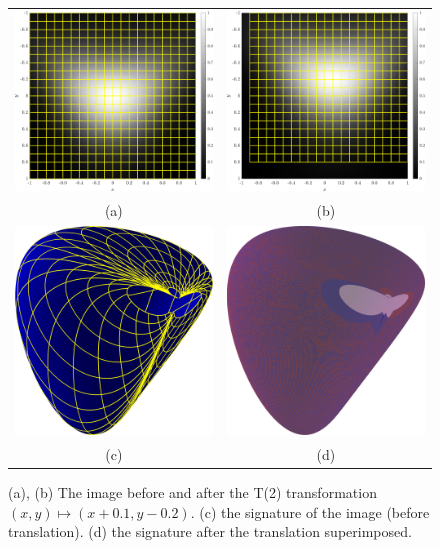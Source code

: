 \documentclass[review,onefignum,onetabnum]{siamonline190516}
\begin{document}
\begin{figure}
  \centering
  \begin{tabular}{cc}
  \includegraphics[width=.45\textwidth]{Figs/function_scanlines} &
  \includegraphics[width=.45\textwidth]{Figs/f_transformed_T2} \\
  (a) & (b) \\
  \includegraphics[width=.45\textwidth]{Figs/T2_signature} &
  \includegraphics[width=.45\textwidth]{Figs/T2_match} \\
  (c) & (d)
  \end{tabular}
  \caption{(a), (b) The image before and after the T(2) transformation $(x,
  y) \mapsto (x + 0.1, y - 0.2)$. (c) the signature of the
  image (before translation). (d) the signature after the
  translation superimposed.}\label{fig:T2}
\end{figure}
\end{document}

